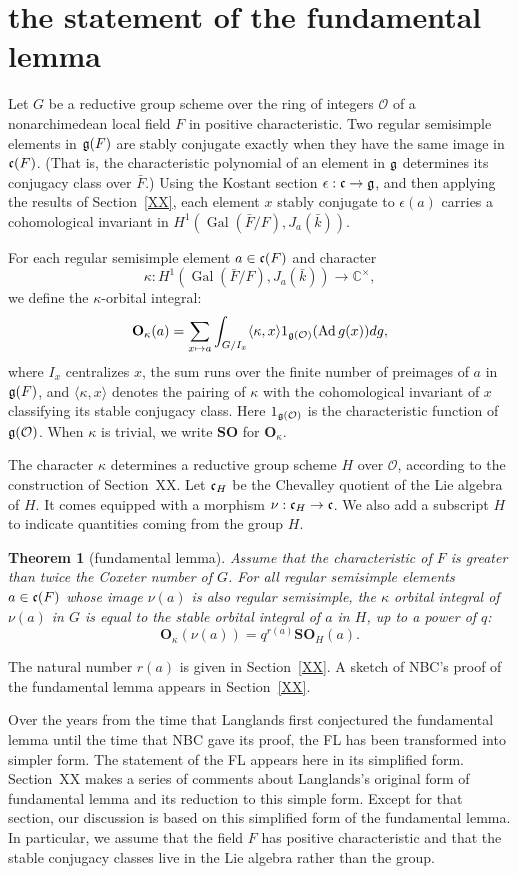 \documentclass[brochure,english,12pt]{bourbaki}
\newtheorem{theorem}[equation]{Theorem}
\def\op#1{{\operatorname{#1}}}
\newcommand{\ring}[1]{\mathbb{#1}}
\def\SO{{\mathbf {SO}}}
\def\OO{{\mathbf O}}
\def\g{\frak{g}}
\def\c{\frak{c}}
\def\O{{\mathcal O}}
\begin{document}
\section{the statement of the fundamental lemma}

Let $G$ be a reductive group scheme over the ring of integers $\O$ of a nonarchimedean local field $F$
in positive characteristic.
Two regular semisimple elements in $\g(F)$ are stably conjugate exactly when they have the
same image in $\c(F)$.  (That is, the characteristic polynomial of an element in $\g$ determines
its conjugacy class over $\bar F$.)  Using the Kostant section $\epsilon:\c\to\g$,
and then applying the results of  Section~\ref{XX}, each element $x$ stably conjugate
to $\epsilon(a)$  carries
a cohomological invariant in $H^1(\op{Gal}(\bar F/F),J_a(\bar k))$.

For each regular semisimple element $a\in \c(F)$ and character 
\[
\kappa:H^1(\op{Gal}(\bar F/F),J_a(\bar k))\to\ring{C}^\times,
\]
we define the
$\kappa$-orbital integral:
\[
\OO_\kappa(a) = \sum_ {x\mapsto a} \int_{G/I_x} \langle\kappa,x\rangle 1_{\g(\O)} (\op{Ad}\, g(x)) dg,
\]
where $I_x$ centralizes $x$, the sum runs over the finite number of preimages of $a$ in $\g(F)$,
and  $\langle\kappa,x\rangle$
denotes the pairing of $\kappa$ with the cohomological invariant of $x$ classifying its stable conjugacy class. 
Here $1_{\g(\O)}$ is the characteristic function of $\g(\O)$.
When $\kappa$ is trivial, we write $\SO$ for $\OO_\kappa$.  

The character $\kappa$ determines a reductive group scheme $H$ over $\O$,
according to the construction of Section~XX.
  Let $\c_H$ be the
Chevalley quotient of the Lie algebra of $H$.  It comes equipped with a morphism $\nu:\c_H\to\c$.
We also add a subscript $H$ to indicate
quantities coming from the group $H$.


\begin{theorem}[fundamental lemma]
Assume that the characteristic of $F$ is greater than twice the Coxeter number of $G$.
For all regular semisimple elements $a\in \c(F)$ whose image
$\nu(a)$ is also regular semisimple, the $\kappa$ orbital integral of $\nu(a)$ in $G$ is
equal to the stable orbital integral of $a$ in $H$, up to a power of $q$:
\[
\OO_\kappa(\nu(a)) = q^{r(a)}\SO_H(a).
\]
\end{theorem}
The  natural number $r(a)$ is given in Section~\ref{XX}.  A sketch of NBC's proof of the fundamental
lemma appears in Section~\ref{XX}.


Over the years from the time that Langlands first conjectured the
fundamental lemma until the time that NBC gave its proof, the FL has
been transformed into simpler form.   The statement of the FL appears here in its simplified form.
Section~XX makes a series of comments about Langlands's original form of fundamental
lemma and its reduction to this simple form.  Except for that section, our discussion is
based on this simplified form of the fundamental lemma.  In particular, we assume that
the field $F$ has positive characteristic and that the stable conjugacy classes live in the
Lie algebra rather than the group.
\end{document}
